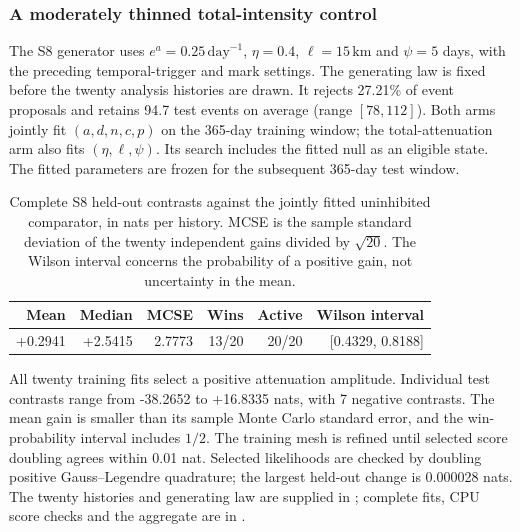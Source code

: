 \subsubsection{A moderately thinned total-intensity control}\label{sec:s8-moderate}
The S8 generator uses $e^a=0.25\,\mathrm{day}^{-1}$, $\eta=0.4$, $\ell=15\,\mathrm{km}$ and $\psi=5$ days, with the preceding temporal-trigger and mark settings. The generating law is fixed before the twenty analysis histories are drawn. It rejects 27.21\% of event proposals and retains 94.7 test events on average (range $[78, 112]$). Both arms jointly fit $(a,d,n,c,p)$ on the 365-day training window; the total-attenuation arm also fits $(\eta,\ell,\psi)$. Its search includes the fitted null as an eligible state. The fitted parameters are frozen for the subsequent 365-day test window.

\begin{table}[htbp]\centering\small
\caption{Complete S8 held-out contrasts against the jointly fitted uninhibited comparator, in nats per history. MCSE is the sample standard deviation of the twenty independent gains divided by $\sqrt{20}$. The Wilson interval concerns the probability of a positive gain, not uncertainty in the mean.}\label{tab:s8-moderate}
\begin{tabular}{@{}rrrrrr@{}}\toprule
Mean & Median & MCSE & Wins & Active & Wilson interval\\\midrule
+0.2941 & +2.5415 & 2.7773 & 13/20 & 20/20 & [0.4329, 0.8188]\\
\bottomrule\end{tabular}\end{table}

All twenty training fits select a positive attenuation amplitude. Individual test contrasts range from -38.2652 to +16.8335 nats, with 7 negative contrasts. The mean gain is smaller than its sample Monte Carlo standard error, and the win-probability interval includes $1/2$. The training mesh is refined until selected score doubling agrees within 0.01 nat. Selected likelihoods are checked by doubling positive Gauss--Legendre quadrature; the largest held-out change is 0.000028 nats. The twenty histories and generating law are supplied in ; complete fits, CPU score checks and the aggregate are in .
